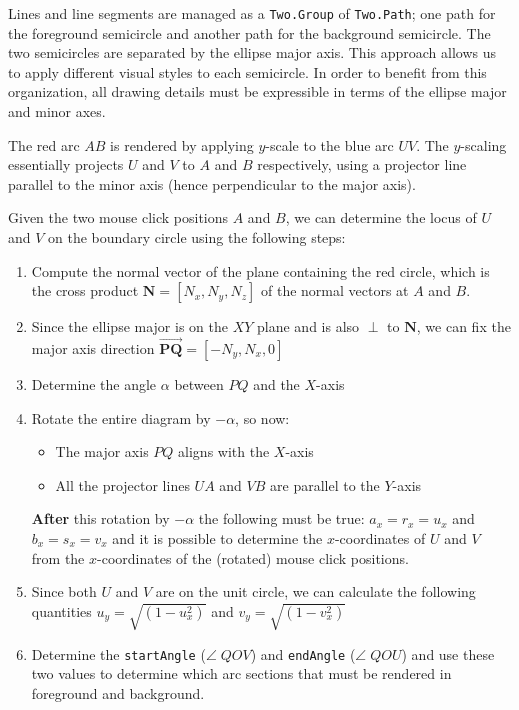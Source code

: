 \documentclass{article}
\begin{document}
Lines and line segments are managed as a \verb|Two.Group| of \verb|Two.Path|;
one path for the foreground semicircle and another path for the background
semicircle. The two semicircles are separated by the ellipse major axis.
This approach allows us to apply different visual styles to each semicircle.
In order to benefit from this organization, all drawing details must be
expressible in terms of the ellipse major and minor axes.

The red arc $AB$ is rendered by applying $y$-scale to the blue arc $UV$.
The $y$-scaling essentially projects $U$ and $V$ to $A$ and $B$ respectively,
using a projector line parallel to the minor axis
(hence perpendicular to the major axis).

Given the two mouse click positions $A$ and $B$, we can determine the locus
of $U$ and $V$ on the boundary circle using the following steps:

\begin{enumerate}
    \item Compute the normal vector of the plane containing the red circle,
          which is the cross product $\mathbf N = [N_x, N_y, N_z]$ of the normal vectors at $A$ and $B$.
    \item Since the ellipse major is on the $XY$ plane and is also $\perp$ to $\mathbf N$, we can fix the major axis direction $\vec{\mathbf {PQ}} = [-N_y, N_x, 0]$
    \item Determine the angle $\alpha$ between $PQ$ and the $X$-axis
    \item Rotate the entire diagram by $-\alpha$, so now:
          \begin{itemize}
              \item The major axis $PQ$ aligns with the $X$-axis
              \item All the projector lines $UA$ and $VB$ are parallel to the $Y$-axis
          \end{itemize}
          \textbf{After} this rotation by $-\alpha$ the following must be true: $a_x = r_x = u_x$  and $b_x = s_x = v_x$ and it is possible to determine the $x$-coordinates of $U$ and $V$ from the $x$-coordinates of the (rotated) mouse click positions.


    \item Since both $U$ and $V$ are on the unit circle, we can calculate the following quantities $u_y = \sqrt{(1 - u_x^2)}$ and $v_y = \sqrt{(1 - v_x^2)}$
    \item Determine the \verb|startAngle| ($\angle\; QOV$) and \verb|endAngle| ($\angle\; QOU$) and use these two values to determine which arc sections that must be rendered in foreground and background.
\end{enumerate}
\end{document}
